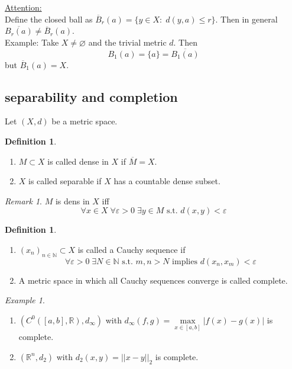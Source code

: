 \documentclass[a4paper, 12pt]{article}
\theoremstyle{plain}
\theoremstyle{definition}
\newtheorem{definition}[theorem]{Definition} %
\theoremstyle{lemma}
\theoremstyle{remark}
\newtheorem{remark}[theorem]{Remark}
\theoremstyle{corollary}
\theoremstyle{example}
\newtheorem{example}[theorem]{Example}
\begin{document}
	\noindent\underline{Attention:}\\
	Define the closed ball as $\overline{B}_r(a) = \{y \in X: \; d(y,a) \leq r\}$. Then in general $\overline{B_r(a)} \neq \overline{B}_r(a)$.\\
	Example: Take $X \neq \varnothing$ and the trivial metric $d$. Then \[B_1(a) = \{a\} = \overline{B_1(a)}\] but $\overline{B}_1(a) = X$.
	
	\subsection{separability and completion}
	Let $(X,d)$ be a metric space.
	\begin{definition}
		\begin{enumerate}
			\item $M \subset X$ is called dense in $X$ if $\overline{M} = X$.
			\item $X$ is called separable if $X$ has a countable dense subset.
		\end{enumerate}
	\end{definition}
	
	\begin{remark}
		$M$ is dens in $X$ iff \[\forall x \in X \; \forall \varepsilon > 0 \; \exists y \in M \text{ s.t. } d(x,y) < \varepsilon\]
	\end{remark}
	
	\begin{definition}
		\begin{enumerate}
			\item $(x_n)_{n \in \mathbb{N}} \subset X$ is called a Cauchy sequence if \[\forall \varepsilon > 0 \; \exists N \in \mathbb{N} \text{ s.t. } m,n > N \text{ implies } d(x_n,x_m) < \varepsilon\]
			\item A metric space in which all Cauchy sequences converge is called complete.
		\end{enumerate}
	\end{definition}
	
	\begin{example}
		\begin{enumerate}
			\item $(C^0([a,b], \mathbb{R}), d_\infty)$ with $d_\infty(f,g) = \max\limits_{x \in [a,b]} \left|f(x)-g(x)\right|$ is complete.
			\item $(\mathbb{R}^n, d_2)$ with $d_2(x,y) = ||x-y||_2$ is complete.
		\end{enumerate}
	\end{example}
	
\end{document}
